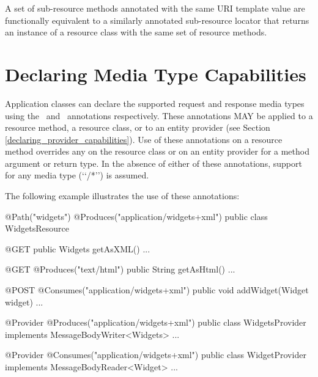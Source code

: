 \begin{nnnote}A set of sub-resource methods annotated with the same URI template value are functionally equivalent to a similarly annotated sub-resource locator that returns an instance of a resource class with the same set of resource methods.\end{nnnote}

\section{Declaring Media Type Capabilities}
\label{declaring_method_capabilities}

Application classes can declare the supported request and response media types using the \Consumes\ and \Produces\ annotations respectively. These annotations MAY be applied to a resource method, a resource class, or to an entity provider (see Section \ref{declaring_provider_capabilities}). Use of these annotations on a resource method overrides any on the resource class or on an entity provider for a method argument or return type. In the absence of either of these annotations, support for any media type (\lq\lq*/*\rq\rq) is assumed.

The following example illustrates the use of these annotations:

\begin{listing}{1}
@Path("widgets")
@Produces("application/widgets+xml")
public class WidgetsResource {
  
  @GET
  public Widgets getAsXML() {...}
  
  @GET
  @Produces("text/html")
  public String getAsHtml() {...}
  
  @POST
  @Consumes("application/widgets+xml")
  public void addWidget(Widget widget) {...}
}

@Provider
@Produces("application/widgets+xml")
public class WidgetsProvider implements MessageBodyWriter<Widgets> {...}

@Provider
@Consumes("application/widgets+xml")
public class WidgetProvider implements MessageBodyReader<Widget> {...}
\end{listing}

